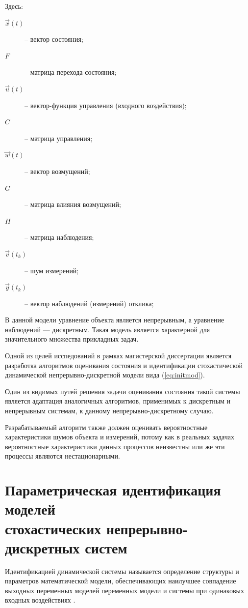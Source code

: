 \documentclass[a4paper,14pt]{extarticle}
\let\oldref\ref
\renewcommand{\ref}[1]{(\oldref{#1})}
\begin{document}
Здесь:
\begin{description}
	\item [$\vec{x}(t)$] -- вектор состояния;
	\item [$F$] -- матрица перехода состояния;
	\item [$\vec{u}(t)$] -- вектор-функция управления (входного воздействия);
	\item [$C$] -- матрица управления;
	\item [$\vec{w}(t)$] -- вектор возмущений;
	\item [$G$] -- матрица влияния возмущений;
	\item [$H$] -- матрица наблюдения;
	\item [$\vec{v}(t_k)$] -- шум измерений;
	\item [$\vec{y}(t_k)$] -- вектор наблюдений (измерений) отклика;
\end{description}

В данной модели уравнение объекта является непрерывным, а уравнение наблюдений
--- дискретным. Такая модель является характерной для значительного множества
прикладных задач.

Одной из целей исспедований в рамках магистерской диссертации является
разработка алгоритмов оценивания состояния и идентификации стохастической 
динамической непрерывно-дискретной модели вида \ref{eq:initmod}. 

Один из видимых путей решения задачи оценивания состояния такой системы
является адаптация аналогичных алгоритмов, применимых к дискретным и
непрерывным системам, к данному непрерывно-дискретному случаю.

Разрабатываемый алгоритм также должен оценивать вероятностные характеристики
шумов объекта и измерений, потому как в реальных задачах вероятностные
характеристики данных процессов неизвестны или же эти процессы являются
нестационарными.

\section[Параметрическая идентификация моделей стохастических
\\непрерывно-дискретных систем]
{Параметрическая идентификация моделей \\стохастических
непрерывно-дискретных систем} 

Идентификацией динамической системы называется определение структуры и
параметров математической модели, обеспечивающих наилучшее совпадение выходных
переменных моделей переменных модели и системы при одинаковых входных
воздействиях \cite{chubich}.
\end{document}
